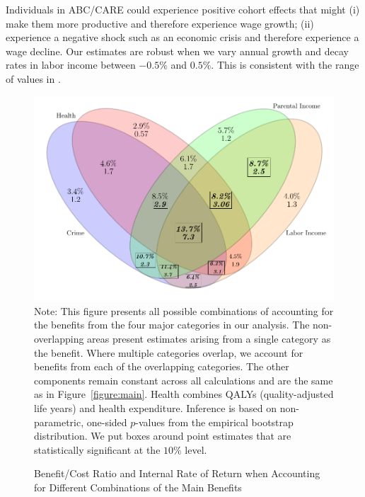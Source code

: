 Individuals in ABC/CARE could experience positive cohort effects that might (i) make them more productive and therefore experience wage growth; (ii) experience a negative shock such as an economic crisis and therefore experience a wage decline. Our estimates are robust when we vary annual growth and decay rates in labor income between $-0.5\%$ and $0.5\%$. This is consistent with the range of values in \citet{Lagakos_Moll_etal_2016_LifeCycle_NBER}.

\begin{figure}[htpb!]
\caption{Benefit/Cost Ratio and Internal Rate of Return when Accounting for Different Combinations of the Main Benefits}\label{figure:vennpooled}
\centering
\includegraphics[width=.7\columnwidth]{output/venn_pooled.pdf}
\footnotesize \justify
Note: This figure presents all possible combinations of accounting for the benefits from the four major categories in our analysis. The non-overlapping areas present estimates arising from a single category as the benefit. Where multiple categories overlap, we account for benefits from each of the overlapping categories. The other components remain constant across all calculations and are the same as in Figure~\ref{figure:main}. Health combines QALYs (quality-adjusted life years) and health expenditure. Inference is based on non-parametric, one-sided $p$-values from the empirical bootstrap distribution. We put boxes around point estimates that are statistically significant at the $10\%$ level.
\end{figure}

